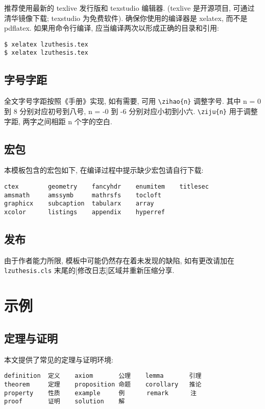 \documentclass{lzuthesis}
\begin{document}
推荐使用最新的 texlive 发行版和 texstudio 编辑器.
(texlive 是开源项目, 可通过清华镜像下载; texstudio 为免费软件).
确保你使用的编译器是 xelatex, 而不是 pdflatex. 如果用命令行编译,
应当编译两次以形成正确的目录和引用:

\begin{verbatim}
$ xelatex lzuthesis.tex
$ xelatex lzuthesis.tex
\end{verbatim}

\subsection{字号字距}

全文字号字距按照《手册》实现, 如有需要, 可用 \verb|\zihao{n}| 调整字号. 其中 n = 0 到 8 分别对应初号到八号, n = -0 到 -6 分别对应小初到小六. \verb|\ziju{n}| 用于调整字距, 两字之间相距 n 个字的空白.

\subsection{宏包}

本模板包含的宏包如下, 在编译过程中提示缺少宏包请自行下载:

\begin{verbatim}
ctex        geometry    fancyhdr    enumitem    titlesec
amsmath     amssymb     mathrsfs    tocloft
graphicx    subcaption  tabularx    array
xcolor      listings    appendix    hyperref
\end{verbatim}

\subsection{发布}

由于作者能力所限, 模板中可能仍然存在着未发现的缺陷, 如有更改请加在
\texttt{lzuthesis.cls} 末尾的[修改日志]区域并重新压缩分享. 

\section{示例}

\subsection{定理与证明}

本文提供了常见的定理与证明环境:

\begin{verbatim}
definition  定义    axiom       公理    lemma       引理
theorem     定理    proposition 命题    corollary   推论
property    性质    example     例      remark      注
proof       证明    solution    解
\end{verbatim}
\end{document}
